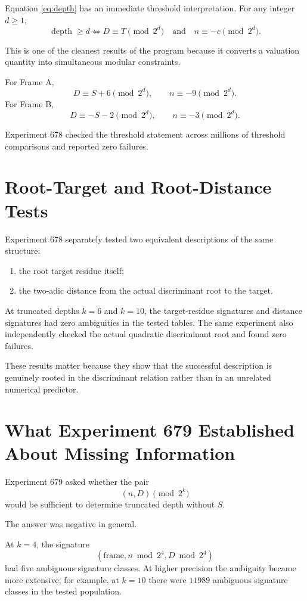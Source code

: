 \documentclass[11pt,a4paper]{article}
\begin{document}
Equation \eqref{eq:depth} has an immediate threshold interpretation.
For any integer $d\ge 1$,
\begin{equation}
 \operatorname{depth}\ge d
\iff
 D\equiv T\pmod{2^d}
 \quad\text{and}\quad
 n\equiv -c\pmod{2^d}.
 \label{eq:threshold}
\end{equation}

This is one of the cleanest results of the program because it converts a valuation quantity into simultaneous modular constraints.

For Frame A,
\[
D\equiv S+6\pmod{2^d},
\qquad
n\equiv -9\pmod{2^d}.
\]
For Frame B,
\[
D\equiv -S-2\pmod{2^d},
\qquad
n\equiv -3\pmod{2^d}.
\]

Experiment 678 checked the threshold statement across millions of threshold comparisons and reported zero failures.

\section{Root-Target and Root-Distance Tests}

Experiment 678 separately tested two equivalent descriptions of the same structure:
\begin{enumerate}[leftmargin=1.7em]
    \item the root target residue itself;
    \item the two-adic distance from the actual discriminant root to the target.
\end{enumerate}

At truncated depths $k=6$ and $k=10$, the target-residue signatures and distance signatures had zero ambiguities in the tested tables.  The same experiment also independently checked the actual quadratic discriminant root and found zero failures.

These results matter because they show that the successful description is genuinely rooted in the discriminant relation rather than in an unrelated numerical predictor.

\section{What Experiment 679 Established About Missing Information}

Experiment 679 asked whether the pair
\[
 (n,D)\pmod{2^k}
\]
would be sufficient to determine truncated depth without $S$.

The answer was negative in general.

At $k=4$, the signature
\[
(\text{frame},n\bmod 2^4,D\bmod 2^4)
\]
had five ambiguous signature classes.  At higher precision the ambiguity became more extensive; for example, at $k=10$ there were $11989$ ambiguous signature classes in the tested population.
\end{document}
